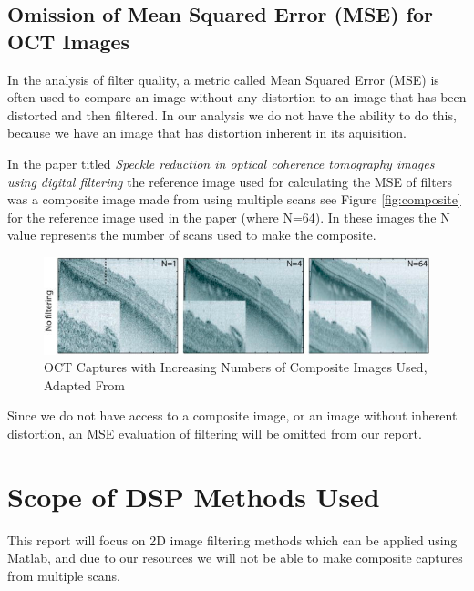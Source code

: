 \documentclass{article}
\begin{document}
  \subsection{\label{sec:level2} Omission of Mean Squared Error (MSE) for OCT Images}

  In the analysis of filter quality, a metric called Mean Squared Error (MSE) is often used to compare an image without any distortion to an image that has been distorted and then filtered. In our analysis we do not have the ability to do this, because we have an image that has distortion inherent in its aquisition.

  In the paper titled \textit{Speckle reduction in optical coherence tomography images using digital filtering} \cite{ozcan_speckle_2007} the reference image used for calculating the MSE of filters was a composite image made from using multiple scans see Figure \ref{fig:composite} for the reference image used in the paper (where N=64). In these images the N value represents the number of scans used to make the composite.

  \begin{figure}
    \centering
    \includegraphics[width=0.7\linewidth]{Figures/composite}
    \caption{OCT Captures with Increasing Numbers of Composite Images Used, Adapted From \cite{ozcan_speckle_2007}}
    \label{fig:Composite}
  \end{figure}

  Since we do not have access to a composite image, or an image without inherent distortion, an MSE evaluation of filtering will be omitted from our report.
	\section{\label{sec:level1} Scope of DSP Methods Used}

	This report will focus on 2D image filtering methods which can be applied using Matlab, and due to our resources we will not be able to make composite captures from multiple scans.
\end{document}

